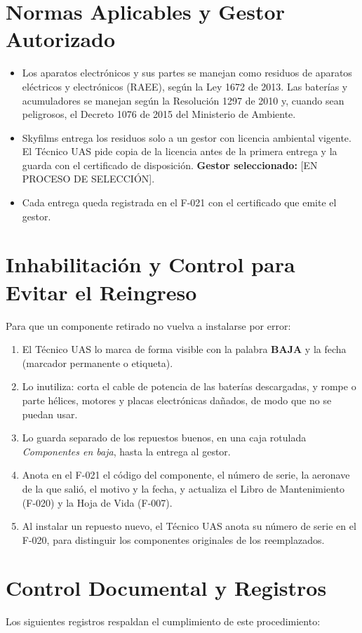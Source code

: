 \section{Normas Aplicables y Gestor Autorizado}
\begin{itemize}
    \item Los aparatos electrónicos y sus partes se manejan como residuos de aparatos eléctricos y electrónicos (RAEE), según la Ley 1672 de 2013. Las baterías y acumuladores se manejan según la Resolución 1297 de 2010 y, cuando sean peligrosos, el Decreto 1076 de 2015 del Ministerio de Ambiente.
    \item Skyfilms entrega los residuos solo a un gestor con licencia ambiental vigente. El Técnico UAS pide copia de la licencia antes de la primera entrega y la guarda con el certificado de disposición. \textbf{Gestor seleccionado:} [EN PROCESO DE SELECCIÓN].
    \item Cada entrega queda registrada en el F-021 con el certificado que emite el gestor.
\end{itemize}

\section{Inhabilitación y Control para Evitar el Reingreso}
Para que un componente retirado no vuelva a instalarse por error:
\begin{enumerate}
    \item El Técnico UAS lo marca de forma visible con la palabra \textbf{BAJA} y la fecha (marcador permanente o etiqueta).
    \item Lo inutiliza: corta el cable de potencia de las baterías descargadas, y rompe o parte hélices, motores y placas electrónicas dañados, de modo que no se puedan usar.
    \item Lo guarda separado de los repuestos buenos, en una caja rotulada \textit{Componentes en baja}, hasta la entrega al gestor.
    \item Anota en el F-021 el código del componente, el número de serie, la aeronave de la que salió, el motivo y la fecha, y actualiza el Libro de Mantenimiento (F-020) y la Hoja de Vida (F-007).
    \item Al instalar un repuesto nuevo, el Técnico UAS anota su número de serie en el F-020, para distinguir los componentes originales de los reemplazados.
\end{enumerate}

\section{Control Documental y Registros}
Los siguientes registros respaldan el cumplimiento de este procedimiento:

